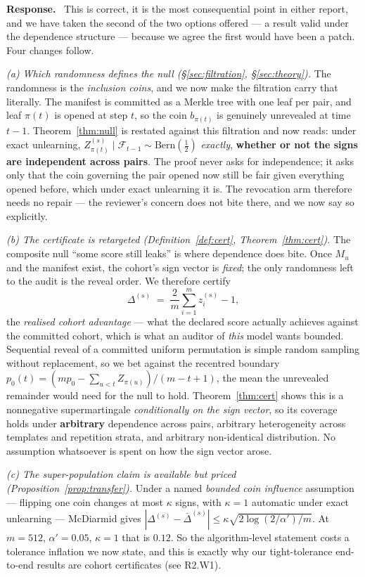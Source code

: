\documentclass[11pt,a4paper]{article}
\newenvironment{reply}{%
  \par\smallskip\noindent\textbf{\color{acol}Response.}\ \begingroup}{\endgroup\par}
\begin{document}
\begin{reply}
This is correct, it is the most consequential point in either report, and we have taken
the second of the two options offered --- a result valid under the dependence structure
--- because we agree the first would have been a patch. Four changes follow.

\emph{(a) Which randomness defines the null (\S\ref{sec:filtration}, \S\ref{sec:theory}).} The randomness is the
\emph{inclusion coins}, and we now make the filtration carry that literally. The
manifest is committed as a Merkle tree with one leaf per pair, and leaf $\pi(t)$ is
opened at step $t$, so the coin $b_{\pi(t)}$ is genuinely unrevealed at time $t-1$.
Theorem~\ref{thm:null} is restated against this filtration and now reads: under exact unlearning,
$Z^{(s)}_{\pi(t)}\mid\mathcal{F}_{t-1}\sim\mathrm{Bern}(\tfrac12)$ \emph{exactly},
\textbf{whether or not the signs are independent across pairs}. The proof never asks
for independence; it asks only that the coin governing the pair opened now still be
fair given everything opened before, which under exact unlearning it is. The revocation
arm therefore needs no repair --- the reviewer's concern does not bite there, and we now
say so explicitly.

\emph{(b) The certificate is retargeted (Definition~\ref{def:cert}, Theorem~\ref{thm:cert}).} The composite null
``some score still leaks'' is where dependence does bite. Once $M_u$ and the manifest
exist, the cohort's sign vector is \emph{fixed}; the only randomness left to the audit
is the reveal order. We therefore certify
\[
\Delta^{(s)} \;=\; \frac{2}{m}\sum_{i=1}^m z_i^{(s)} - 1,
\]
the \emph{realised cohort advantage} --- what the declared score actually achieves
against the committed cohort, which is what an auditor of \emph{this} model wants
bounded. Sequential reveal of a committed uniform permutation is simple random sampling
without replacement, so we bet against the recentred boundary
$p_0(t) = (m p_0 - \sum_{u<t} Z_{\pi(u)})/(m-t+1)$, the mean the unrevealed remainder
would need for the null to hold. Theorem~\ref{thm:cert} shows this is a nonnegative supermartingale
\emph{conditionally on the sign vector}, so its coverage holds under \textbf{arbitrary}
dependence across pairs, arbitrary heterogeneity across templates and repetition
strata, and arbitrary non-identical distribution. No assumption whatsoever is spent on
how the sign vector arose.

\emph{(c) The super-population claim is available but priced (Proposition~\ref{prop:transfer}).} Under a
named \emph{bounded coin influence} assumption --- flipping one coin changes at most
$\kappa$ signs, with $\kappa=1$ automatic under exact unlearning --- McDiarmid gives
$|\Delta^{(s)} - \bar\Delta^{(s)}| \le \kappa\sqrt{2\log(2/\alpha')/m}$. At $m=512$,
$\alpha'=0.05$, $\kappa=1$ that is $0.12$. So the algorithm-level statement costs a
tolerance inflation we now state, and this is exactly why our tight-tolerance
end-to-end results are cohort certificates (see R2.W1).


\end{reply}
\end{document}
